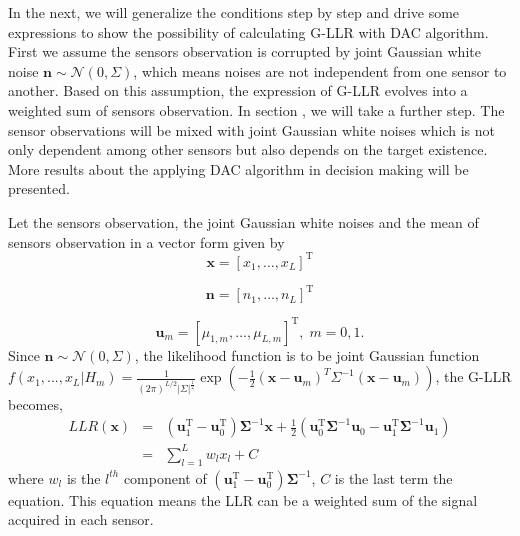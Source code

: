 In the next, we will generalize the conditions step by step and drive
some expressions to show the possibility of calculating G-LLR with
DAC algorithm. First we assume the sensors observation is corrupted
by joint Gaussian white noise $\mathbf{n}\sim\mathcal{N}\left(0,\Sigma\right)$,
which means noises are not independent from one sensor to another.
Based on this assumption, the expression of G-LLR evolves into a weighted
sum of sensors observation. In section ,
we will take a further step. The sensor observations will be mixed
with joint Gaussian white noises which is not only dependent among
other sensors but also depends on the target existence. More results
about the applying DAC algorithm in decision making will be presented. 

Let the sensors observation, the joint Gaussian white noises and the
mean of sensors observation in a vector form given by 
\[
\mathbf{x}=\left[x_{1},\ldots,x_{L}\right]^{\mathrm{T}}
\]


\[
\mathbf{n}=\left[n_{1},\ldots,n_{L}\right]^{\mathrm{T}}
\]


\begin{equation}
\mathbf{u}_{m}=\left[\mu_{1,m},\ldots,\mu_{L,m}\right]^{\mathrm{T}},\; m=0,1.
\end{equation}
Since $\mathbf{n}\sim\mathcal{N}\left(0,\Sigma\right)$, the likelihood
function is to be joint Gaussian function $f\left(x_{1},...,x_{L}|H_{m}\right)=\frac{1}{\left(2\pi\right)^{L/2}\left|\Sigma\right|^{\frac{1}{2}}}\exp\left(-\frac{1}{2}\left(\mathbf{x}-\mathbf{u}_{m}\right)^{T}\Sigma^{-1}\left(\mathbf{x}-\mathbf{u}_{m}\right)\right)$,
the G-LLR becomes, 
\begin{eqnarray}
LLR(\mathbf{x}) & = & \left(\mathbf{u}_{1}^{\mathrm{T}}-\mathbf{u}_{0}^{\mathrm{T}}\right)\mathbf{\Sigma}^{-1}\mathbf{x}+\frac{1}{2}\left(\mathbf{u}_{0}^{\mathrm{T}}\mathbf{\Sigma}^{-1}\mathbf{u}_{0}-\mathbf{u}_{1}^{\mathrm{T}}\mathbf{\Sigma}^{-1}\mathbf{u}_{1}\right)\label{eq:wight sum of detection}\\
 & = & \sum_{l=1}^{L}w_{l}x_{l}+C\nonumber 
\end{eqnarray}
where $w_{l}$ is the $l^{th}$ component of $\left(\mathbf{u}_{1}^{\mathrm{T}}-\mathbf{u}_{0}^{\mathrm{T}}\right)\mathbf{\Sigma}^{-1}$,
$C$ is the last term the equation. This equation means the LLR can
be a weighted sum of the signal acquired in each sensor.

